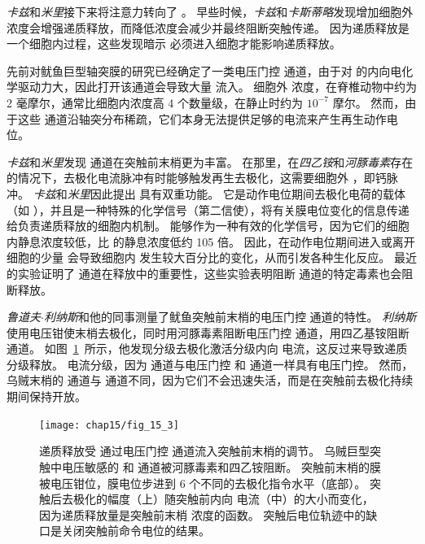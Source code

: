 \textit{卡兹}和\textit{米里}接下来将注意力转向了 。
早些时候，\textit{卡兹}和\textit{卡斯蒂略}发现增加细胞外  浓度会增强递质释放，而降低浓度会减少并最终阻断突触传递。
因为递质释放是一个细胞内过程，这些发现暗示  必须进入细胞才能影响递质释放。


先前对鱿鱼巨型轴突膜的研究已经确定了一类电压门控  通道，由于对  的内向电化学驱动力大，因此打开该通道会导致大量  流入。
细胞外  浓度，在脊椎动物中约为 2 毫摩尔，通常比细胞内浓度高 4 个数量级，在静止时约为 $10^{-7}$ 摩尔。
然而，由于这些  通道沿轴突分布稀疏，它们本身无法提供足够的电流来产生再生动作电位。


\textit{卡兹}和\textit{米里}发现  通道在突触前末梢更为丰富。
在那里，在\textit{四乙铵}和\textit{河豚毒素}存在的情况下，去极化电流脉冲有时能够触发再生去极化，这需要细胞外 ，即钙脉冲。
\textit{卡兹}和\textit{米里}因此提出  具有双重功能。
它是动作电位期间去极化电荷的载体（如 ），并且是一种特殊的化学信号（第二信使），将有关膜电位变化的信息传递给负责递质释放的细胞内机制。
 能够作为一种有效的化学信号，因为它们的细胞内静息浓度较低，比  的静息浓度低约 105 倍。
因此，在动作电位期间进入或离开细胞的少量  会导致细胞内  发生较大百分比的变化，从而引发各种生化反应。
最近的实验证明了  通道在释放中的重要性，这些实验表明阻断  通道的特定毒素也会阻断释放。


\textit{鲁道夫$\cdot$利纳斯}和他的同事测量了鱿鱼突触前末梢的电压门控  通道的特性。
\textit{利纳斯}使用电压钳使末梢去极化，同时用河豚毒素阻断电压门控  通道，用四乙基铵阻断  通道。
如图~\ref{fig:15_3}~所示，他发现分级去极化激活分级内向  电流，这反过来导致递质分级释放。
 电流分级，因为  通道与电压门控  和  通道一样具有电压门控。
然而，乌贼末梢的  通道与  通道不同，因为它们不会迅速失活，而是在突触前去极化持续期间保持开放。


\begin{figure}[htbp]
	\centering
	\texttt{[image: chap15/fig\_15\_3]}
	\caption{递质释放受  通过电压门控  通道流入突触前末梢的调节。
	乌贼巨型突触中电压敏感的  和  通道被河豚毒素和四乙铵阻断。
	突触前末梢的膜被电压钳位，膜电位步进到 6 个不同的去极化指令水平（底部）。
	突触后去极化的幅度（上）随突触前内向  电流（中）的大小而变化，因为递质释放量是突触前末梢  浓度的函数。
	突触后电位轨迹中的缺口是关闭突触前命令电位的结果\cite{llinas1977depolarization}。}
	\label{fig:15_3}
\end{figure}


